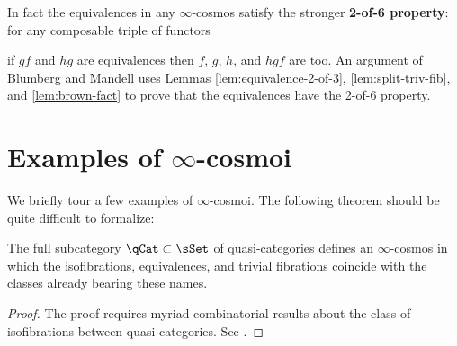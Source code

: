 \begin{rmk}\label{rmk:2-of-6}
In fact the equivalences in any $\infty$-cosmos satisfy the stronger \textbf{2-of-6 property}: for any composable triple of functors
\begin{center}
\end{center}
if $gf$ and $hg$ are equivalences then $f$, $g$, $h$, and $hgf$ are too. An argument of Blumberg and Mandell \cite[6.4]{BlumbergMandell:2011ak} uses Lemmas \ref{lem:equivalence-2-of-3}, \ref{lem:split-triv-fib}, and \ref{lem:brown-fact} to prove that the equivalences have the 2-of-6 property.
\end{rmk}


\section{Examples of \texorpdfstring{$\infty$}{infinity}-cosmoi}\label{sec:examples}

We briefly tour a few examples of $\infty$-cosmoi. %
The following theorem should be quite difficult to formalize:

\begin{proposition}\label{prop:qcat-cosmos}
  The full subcategory $\qCat\subset\sSet$ of quasi-categories defines an $\infty$-cosmos in which the isofibrations, equivalences, and trivial fibrations coincide with the classes  already bearing these names.
\end{proposition}
\begin{proof}
 The proof requires myriad combinatorial results about the class of isofibrations between quasi-categories. See \cite[\S D]{RiehlVerity:2022eo}.
\end{proof}


